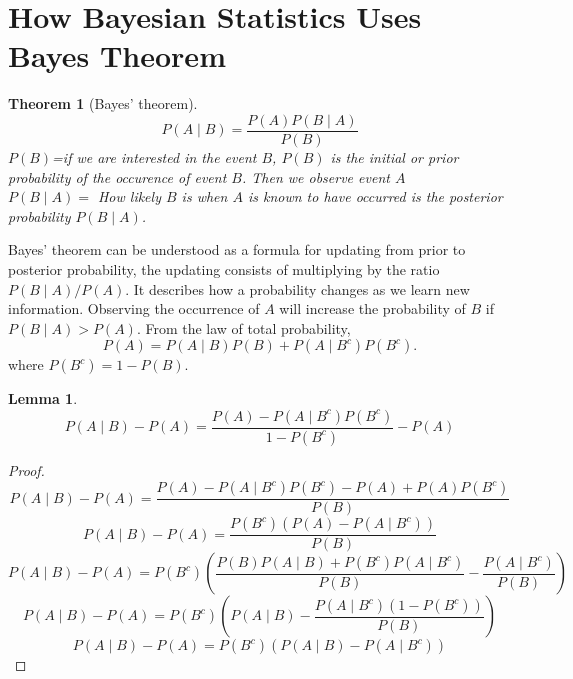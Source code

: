 \documentclass[lecture,12pt,]{pcms-l}
\numberwithin{section}{chapter}
\numberwithin{equation}{chapter}
\theoremstyle{plain}
\newtheorem{theorem}[equation]{Theorem}
\newtheorem{lemma}[equation]{Lemma}
\theoremstyle{definition}
\theoremstyle{definition}
\begin{document}
\section{How Bayesian Statistics Uses Bayes Theorem}
\begin{theorem}[Bayes' theorem]
\label{Bayes}
\[P(A\mid B)=\frac{P(A)P(B\mid A)}{P(B)}\]
$P(B)$=if we are interested in the event $B$, $P(B)$ is the initial or prior probability of the occurence of event $B$. Then we observe event $A$ 
\\
$P(B\mid A)=$ How likely $B$ is when $A$ is known to have occurred is the posterior probability $P(B\mid A)$. 
\end{theorem}
Bayes' theorem can be understood as a formula for updating from prior to posterior probability, the updating consists of multiplying by the ratio $P(B\mid A)/P(A)$. It describes how a probability changes as we learn new information. Observing the occurrence of $A$ will increase the probability of $B$ if $P(B\mid A)>P(A)$.
From the law of total probability,
\begin{equation}
P(A)=P(A\mid B)P(B)+P(A\mid B^c)P(B^c).
\end{equation}
where $P(B^c)=1-P(B)$.
\begin{lemma}
\[P(A\mid B)-P(A)=\frac{P(A)-P(A\mid B^c)P(B^c)}{1-P(B^c)}-P(A)\]
\end{lemma}
 
\begin{proof}
\[P(A\mid B)-P(A)=\frac{P(A)-P(A\mid B^c)P(B^c)-P(A)+P(A)P(B^c)}{P(B)}\]
\[P(A\mid B)-P(A)=\frac{P(B^c)(P(A)-P(A\mid B^c))}{P(B)}\]
\[P(A\mid B)-P(A)=P(B^c)(\frac{P(B)P(A\mid B)+P(B^c)P(A\mid B^c)}{P(B)}-\frac{P(A\mid B^c)}{P(B)})\]
\[P(A\mid B)-P(A)=P(B^c)(P(A\mid B)-\frac{P(A\mid B^c)(1-P(B^c))}{P(B)})\]
\[P(A\mid B)-P(A)=P(B^c)(P(A\mid B)-P(A\mid B^c))\]
\end{proof}
\end{document}
